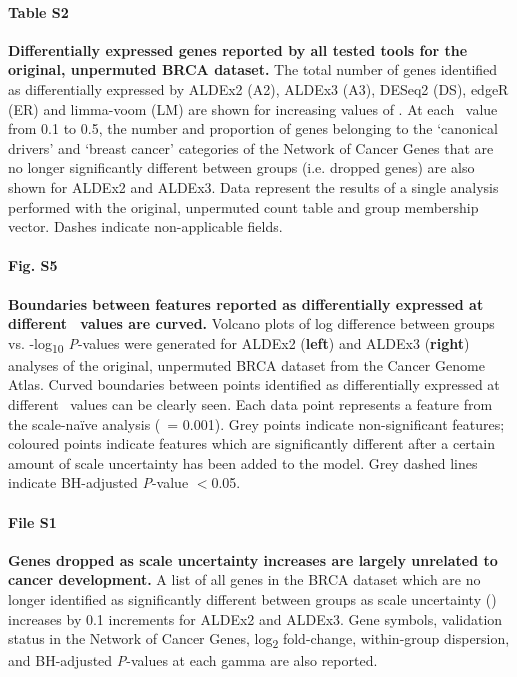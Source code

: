 \documentclass[10pt,letterpaper]{article}
\begin{document}
\paragraph*{Table S2}
\label{tab:sigGenesReal}
\textbf{Differentially expressed genes reported by all tested tools for the original, unpermuted BRCA dataset.} The total number of genes identified as differentially expressed by ALDEx2 (A2), ALDEx3 (A3), DESeq2 (DS), edgeR (ER) and limma-voom (LM) are shown for increasing values of \textgamma. At each \textgamma~value from 0.1 to 0.5, the number and proportion of genes belonging to the `canonical drivers' and `breast cancer' categories of the Network of Cancer Genes \cite{repana_network_2019} that are no longer significantly different between groups (i.e. dropped genes) are also shown for ALDEx2 and ALDEx3. Data represent the results of a single analysis performed with the original, unpermuted count table and group membership vector. Dashes indicate non-applicable fields. 

\paragraph*{Fig. S5}
\label{fig:supFigEffect}
\textbf{Boundaries between features reported as differentially expressed at different \textgamma~values are curved.} Volcano plots of log difference between groups vs. -log\textsubscript{10} \textit{P}-values were generated for ALDEx2 (\textbf{left}) and ALDEx3 (\textbf{right}) analyses of the original, unpermuted BRCA dataset from the Cancer Genome Atlas. Curved boundaries between points identified as differentially expressed at different \textgamma~values can be clearly seen. Each data point represents a feature from the scale-na\"ive analysis (\textgamma~= 0.001). Grey points indicate non-significant features; coloured points indicate features which are significantly different after a certain amount of scale uncertainty has been added to the model. Grey dashed lines indicate BH-adjusted \textit{P}-value $<$0.05.

\paragraph*{File S1}
\label{file:supFileDroppedGenes}
\textbf{Genes dropped as scale uncertainty increases are largely unrelated to cancer development.} A list of all genes in the BRCA dataset which are no longer identified as significantly different between groups as scale uncertainty (\textgamma) increases by 0.1 increments for ALDEx2 and ALDEx3. Gene symbols, validation status in the Network of Cancer Genes, log\textsubscript{2} fold-change, within-group dispersion, and BH-adjusted \textit{P}-values at each gamma are also reported.
\end{document}
